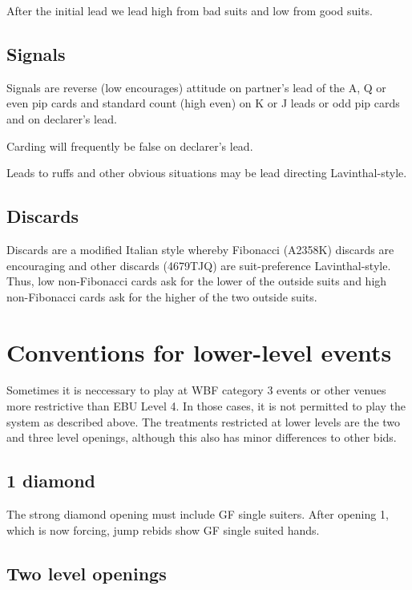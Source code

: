 \documentclass[a4paper,14pt]{extarticle}
\begin{document}
After the initial lead we lead high from bad suits and low from good suits.

\subsection{Signals}
\label{sec:card:signals}

Signals are reverse (low encourages) attitude on partner's lead of the A, Q or
even pip cards and standard count (high even) on K or J leads or odd pip cards
and on declarer's lead.

Carding will frequently be false on declarer's lead.

Leads to ruffs and other obvious situations may be lead directing Lavinthal-style.

\subsection{Discards}
\label{sec:card:discards}

Discards are a modified Italian style whereby Fibonacci (A2358K) discards are
encouraging and other discards (4679TJQ) are suit-preference
Lavinthal-style. Thus, low non-Fibonacci cards ask for the lower of the outside
suits and high non-Fibonacci cards ask for the higher of the two outside suits.
\newpage

\section{Conventions for lower-level events}
\label{sec:cat3}

Sometimes it is neccessary to play at WBF category 3 events or other venues
more restrictive than EBU Level 4. In those cases, it is not permitted to play
the system as described above. The treatments restricted at lower levels are
the two and three level openings, although this also has minor differences to
other bids.

\subsection{1 diamond}

The strong diamond opening must include GF single suiters. After opening
1\diamonds, which is now forcing, jump rebids show GF single suited hands.

\subsection{Two level openings}
\end{document}
